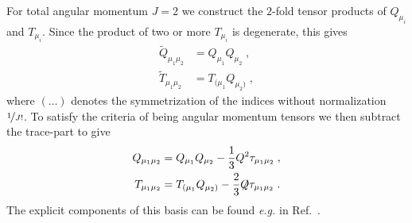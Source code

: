 %
%
%
%
%
For total angular momentum $J=2$ we construct the $2$-fold tensor products of $Q_{\mu_i}$ and 
$T_{\mu_i}$. Since the product of two or more $T_{\mu_i}$ is degenerate, this gives 
%
\begin{align}
  \tilde{Q}_{\mu_1\mu_2} &= Q_{\mu_1}Q_{\mu_2} \; , \\
  \tilde{T}_{\mu_1\mu_2} &=T_{(\mu_1}Q_{\mu_2)} \;,%
\end{align}
%
where ${(\ldots)}$ denotes the symmetrization of the indices without normalization 
$\nicefrac{1}{J!}$.
%
To satisfy the criteria of being angular momentum tensors we then subtract the trace-part to give~\cite{LlewellynSmith:1969az,Krassnigg:2010mh}
%
\begin{align}
  Q_{\mu_1\mu_2} &= Q_{\mu_1} Q_{\mu_2} - \frac{1}{3}Q^2 \tau_{\mu_1\mu_2} \;, \\
  T_{\mu_1\mu_2} &= T_{(\mu_1} Q_{\mu_2)} -\frac{2}{3} \mkern-4mu \not \mkern-6mu Q\tau_{\mu_1\mu_2}\;.
\end{align}
%
The explicit components 
of this basis can be found {\it e.g.} in Ref.~\cite{Krassnigg:2010mh}.

